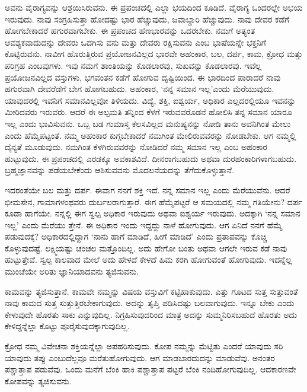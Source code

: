 ಅವನು ವೈರಾಗ್ಯವನ್ನು ಆಶ್ರಯಿಸಿರುವನು. ಈ ಪ್ರಪಂಚದಲ್ಲಿ ಎಲ್ಲಾ ಭಯದಿಂದ ಕೂಡಿದೆ. ವೈರಾಗ್ಯ ಒಂದರಲ್ಲೇ ಅಭಯ ಇರುವುದು. ನಾವು ಸಂಗ್ರಹಿಸುತ್ತಾ ಹೋದಷ್ಟು ಭಾರ ಹೆಚ್ಚುವುದು, ಜವಾಬ್ದಾರಿ ಹೆಚ್ಚುವುದು. ನಾವು ದೇವರ ಕಡೆಗೆ ಹೋಗಬೇಕಾದರೆ ಹಗುರವಾಗಬೇಕು. ಈ ಪ್ರಪಂಚದ ಹೆಣಭಾರವನ್ನು ಒದರಬೇಕು. ನಮಗೆ ಅತ್ಯಂತ ಆವಶ್ಯಕವಾದುದನ್ನು ದೇವರು ಒದಗಿಸು ವನು ಮತ್ತು ದೇವರು ರಕ್ಷಿಸುವನು ಎಂಬ ಭಾಷೆಯನ್ನೇ ಭಕ್ತನಿಗೆ ಕೊಟ್ಟಿರುವನು. ನಾವೀಗ ಹೊರುತ್ತಿರುವ ಪ್ರಯೋಜನವಿಲ್ಲದ ಭಾರವೇ ಅಹಂಕಾರ, ಬಲ, ದರ್ಪ, ಕಾಮ, ಕ್ರೋಧ ಮತ್ತು ಪರಿಗ್ರಹ ಎಂಬವುಗಳು. ಇವು ನಮಗೆ ಶಾಂತಿಯನ್ನು ಕೊಡಲಾರವು, ಸುಖವನ್ನು ಕೊಡಲಾರವು. ಇವೆಲ್ಲ ಪ್ರಯೋಜನವಿಲ್ಲದ ವಸ್ತುಗಳು, ಭಗವಂತನ ಕಡೆಗೆ ಹೋಗುವ ದೃಷ್ಟಿಯಿಂದ. ಈ ಭಾರದಿಂದ ಪಾರಾದರೆ ನಾವು ಹಗುರವಾಗಿ ದೇವರೆಡೆಗೆ ಬೇಗ ಹೋಗಬಹುದು. ಅಹಂಕಾರ, ‘ನನ್ನ ಸಮಾನ ಇಲ್ಲ’ಎಂದು ಮೆರೆಯುವುದು. ಯಾವುದರಲ್ಲಿ ಇವನಿಗೆ ಸಮಾನವಿಲ್ಲವೋ ತಿಳಿಯದು. ವಿದ್ಯೆ, ಶಕ್ತಿ, ಐಶ್ವರ್ಯ, ಅಧಿಕಾರ ಎಲ್ಲದರಲ್ಲಿಯೂ ಇವನನ್ನು ಮೀರಿದವರು ಇರುವರು. ಆದರೆ ಈ ಅಲ್ಪಮತಿ ತನ್ನಿಂದ ಕೆಳಗೆ ಇರುವವರೊಡನೆ ಹೋಲಿಸಿ ತನ್ನ ಸಮಾನ ಯಾರೂ ಇಲ್ಲ ಎಂದು ಭಾವಿಸುವನು. ಒಬ್ಬ ಬಡ ಗುಮಾಸ್ತ ಕೆಲಸವಿಲ್ಲದ ಮನುಷ್ಯನನ್ನು ನೋಡಿ ತಾನು ಅವನಿಗಿಂತ ಮೇಲು ಎಂದು ಹೆಮ್ಮೆಪಟ್ಟಂತೆ. ನಮ್ಮ ಅಹಂಕಾರ ಕುಗ್ಗಬೇಕಾದರೆ ನಮಗಿಂತ ಮೇಲಿರುವವರನ್ನು ನೋಡಬೇಕು. ಆಗ ನಮ್ಮಲ್ಲಿ ದೈನ್ಯತೆ ಮೂಡುವುದು. ನಮಗಿಂತ ಕೆಳಗಿರುವವರನ್ನು ನೋಡಿದರೆ ನಮ್ಮ ಸಮಾನ ಇಲ್ಲ ಎಂಬ ಅಹಂಕಾರ ಹುಟ್ಟುವುದು. ಈ ಪ್ರಪಂಚದಲ್ಲಿ ಎರಡಕ್ಕೂ ಅವಕಾಶವಿದೆ. ದೀನರಾಗಬಹುದು ಅಥವಾ ದುರಹಂಕಾರಿಗಳಾಗಬಹುದು. ಬ್ರಹ್ಮಜ್ಞಾನವನ್ನು ಪಡೆಯಬೇಕೆಂದು ಆಶಿಸುವವನು ಮೊದಲನೆಯದನ್ನು ತೆಗೆದುಕೊಳ್ಳುತ್ತಾನೆ.

ಇದರಂತೆಯೇ ಬಲ ಮತ್ತು ದರ್ಪ. ಈವಾಗ ನನಗೆ ಶಕ್ತಿ ಇದೆ. ನನ್ನ ಸಮಾನ ಇಲ್ಲ ಎಂದು ಮೆರೆಯುವೆನು. ಆದರೆ ಭೀಮಸೇನ, ಗಾಮಾಗಳಂಥವರು ದುರ್ಬಲರಾಗುತ್ತಾರೆ. ಈಗ ಹೆಮ್ಮೆಪಟ್ಟರೆ ಆ ಸಮಯದಲ್ಲಿ ನಮ್ಮ ಗತಿಯೇನು? ದರ್ಪ ಕೂಡಾ ಹಾಗೆಯೇ. ನನ್ನಲ್ಲಿ ಈಗ ಸ್ವಲ್ಪ ಅಧಿಕಾರ ಇರುವುದು ಅಥವಾ ಐಶ್ವರ್ಯ ಇರುವುದು. ಅದಕ್ಕಾಗಿ ‘ನನ್ನ ಸಮಾನ ಇಲ್ಲ’ ಎಂದು ಮೆರೆಯು ತ್ತೇನೆ. ಈ ಅಧಿಕಾರ ಇಂದು ಇದ್ದದ್ದು ನಾಳೆ ಹೋಗುವುದು. ಆಗ ಏನಿದೆ ನನಗೆ ಹೆಮ್ಮೆ ಪಡುವುದಕ್ಕೆ? ಅಧಿಕಾರದಲ್ಲಿದ್ದಾಗ ‘ನಾನು ಹಾಗೆ ಮಾಡಿದೆ, ಹೀಗೆ ಮಾಡಿದೆ’ ಎಂದು ಪ್ರತಾಪವನ್ನು ಕೊಚ್ಚಿ ಕೊಳ್ಳುವುದಷ್ಟೆ. ಲಕ್ಷ್ಮಿಯಷ್ಟು ಚಂಚಲ ಮತ್ತೊಂದಿಲ್ಲ. ಅದು ಹೇಗೋ ಬಂತು ಅಥವಾ ಆಗಲೇ ಇರುವ ಕಡೆ ನಾವು ಹುಟ್ಟುತ್ತೇವೆ. ಸ್ವಲ್ಪ ಕಾಲವಾದ ಮೇಲೆ ಅದು ಹೇಳದೆ ಕೇಳದೆ ಹಿಮ ಕರಗಿ ಹೋಗುವಂತೆ ಹೋಗುವುದು. ಇದನ್ನೆಲ್ಲ ಮುಂಚೆಯೇ ಅರಿತು ಜ್ಞಾನಿಯಾದವನು ತ್ಯಜಿಸುವನು.

ಕಾಮವನ್ನು ತ್ಯಜಿಸುತ್ತಾನೆ. ಕಾಮವೇ ನಮ್ಮನ್ನು ವಿಷಯ ವಸ್ತುವಿಗೆ ಕಟ್ಟಿಹಾಕುವುದು. ಎತ್ತು ಗೂಟದ ಸುತ್ತ ಸುತ್ತುವಂತೆ ನಾವು ಕಾಮದ ಸುತ್ತ ಸುತ್ತುತ್ತಿರಬೇಕಾಗುವುದು. ಅದನ್ನು ತೃಪ್ತಿ ಪಡಿಸಿದಷ್ಟು ಬಲವಾಗುವುದು. ಇನ್ನೂ ಬೇಕು ಎಂದು ಕೇಳುವುದೇ ಹೊರತು ಸಾಕು ಎನ್ನುವುದಿಲ್ಲ. ನಿಗ್ರಹಿಸುವುದರಿಂದ ಮಾತ್ರ ಅದನ್ನು ಸುಮ್ಮನಿರಿಸಬಹುದೆ ಹೊರತು ಅದು ಕೇಳಿದ್ದನ್ನೆಲ್ಲಾ ಕೊಟ್ಟು ಪೂರೈಸುವುದಕ್ಕಾಗುವುದಿಲ್ಲ.

ಕ್ರೋಧ ನಮ್ಮ ವಿವೇಚನಾ ಶಕ್ತಿಯನ್ನೆಲ್ಲಾ ಅಪಹರಿಸುವುದು. ಕೋಪ ನಮ್ಮನ್ನು ಮೆಟ್ಟಿತು ಎಂದರೆ ಯಾವುದು ಸರಿ ಯಾವುದು ತಪ್ಪು ಎಂಬುದೆಲ್ಲವೂ ಮರೆತುಹೋಗುವುದು. ಆಗ ಮಾಡಬಾರದುದನ್ನು ಮಾಡುವೆವು. ಅನಂತರ ಪಶ್ಚಾತ್ತಾಪ ಪಡುವೆವು. ಒಂದು ಮನೆಗೆ ಬೆಂಕಿ ಹಾಕಿ ಪಶ್ಚಾತ್ತಾಪ ಪಟ್ಟರೆ ಬೆಂಕಿ ನಂದಿಹೋಗುವುದಿಲ್ಲ. ಆದಕಾರಣವೇ ಕೋಪವನ್ನು ತ್ಯಜಿಸುವನು.

